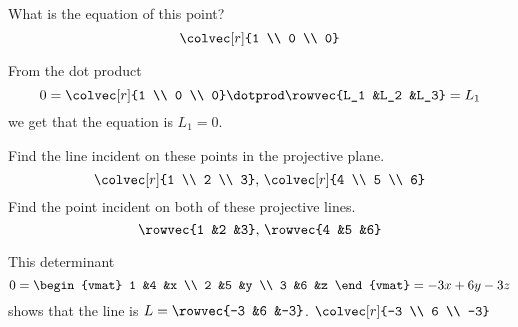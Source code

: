 \begin{exercises}
  \item 
    What is the equation of this point?
    \begin{equation*}
       \colvec[r]{1 \\ 0 \\ 0}
    \end{equation*}
    \begin{answer}
      From the dot product
      \begin{equation*}
        0=\colvec[r]{1 \\ 0 \\ 0}\dotprod\rowvec{L_1 &L_2 &L_3}
         =L_1
      \end{equation*}
      we get that the equation is $L_1=0$.
    \end{answer}
  \item 
    \begin{exparts}
      \partsitem Find the line incident on these points in the 
         projective plane.
         \begin{equation*}
           \colvec[r]{1 \\ 2 \\ 3},\,\colvec[r]{4 \\ 5 \\ 6}
         \end{equation*}
      \partsitem Find the point incident on both of 
         these projective lines. 
         \begin{equation*}
           \rowvec{1 &2 &3},\,\rowvec{4 &5 &6}
         \end{equation*} 
    \end{exparts}
    \begin{answer}
      \begin{exparts}
        \partsitem This determinant
          \begin{equation*}
            0=\begin{vmat}
              1  &4  &x \\
              2  &5  &y \\
              3  &6  &z
            \end{vmat}
            =-3x+6y-3z
          \end{equation*}
          shows that the line is $L=\rowvec{-3 &6 &-3}$.
        \partsitem $\colvec[r]{-3 \\ 6 \\ -3}$
      \end{exparts}

\end{answer}
\end{exercises}
